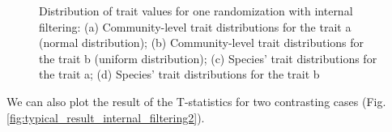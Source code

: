 \documentclass[12pt]{article}\usepackage[]{graphicx}\usepackage[]{color}
\newenvironment{knitrout}{}{} %
\begin{document}
\begin{knitrout}
\begin{figure}
{}

\caption[Distribution of trait values for one randomization with internal filtering]{Distribution of trait values for one randomization with internal filtering: (a) Community-level trait distributions for the trait a (normal distribution); (b) Community-level trait distributions for the trait b (uniform distribution); (c) Species' trait distributions for the trait a; (d) Species' trait distributions for the trait b}\label{fig:typical_result_internal_filtering1}
\end{figure}


\end{knitrout}

We can also plot the result of the T-statistics for two contrasting cases (Fig. \ref{fig:typical_result_internal_filtering2}).
\end{document}
